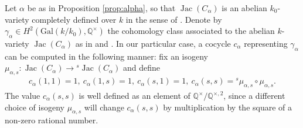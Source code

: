 \documentclass[oneside]{amsart}
\theoremstyle{remark}
\newcommand{\ra}{\rightarrow}
\newcommand{\Q}{\mathbb Q}
\newcommand{\Gal}{\mathrm{Gal}}
\newcommand{\Jac}{\operatorname{Jac}}
\numberwithin{equation}{section}
\begin{document}
Let $\alpha$ be as in Proposition \ref{prop:alpha}, so that $\Jac(C_\alpha)$ is an abelian $k_0$-variety completely defined over $k$ in the sense of \cite[\S3]{GQ14}. Denote by $\gamma_\alpha\in H^2(\Gal(k/k_0),\Q^\times)$ the cohomology class associated to the abelian $k$-variety $\Jac(C_\alpha)$ as in \cite{Rib92} and \cite{Pyl04}. In our particular case, a cocycle $c_\alpha$ representing $\gamma_\alpha$ can be computed in the following manner: fix an isogeny $\mu_{\alpha,{s}}\colon\Jac(C_\alpha)\ra {{}^{{s}}\Jac}(C_\alpha)$ and define
\begin{align*}
  c_\alpha(1,1) = 1,\ c_\alpha(1,{s})=1, \ c_\alpha ({s},1 ) = 1,\ c_\alpha({s},{s})={{}^{s} \mu}_{\alpha,{s}}\circ \mu_{\alpha,{s}}.
\end{align*}
The value $c_\alpha({s},{s})$ is well defined as an element of $\Q^\times /\Q^{\times,2}$, since a different choice of isogeny $\mu_{\alpha,{s}}$ will change $c_\alpha({s},{s})$ by multiplication by the square of a non-zero rational number.
\end{document}
